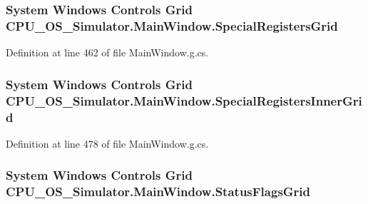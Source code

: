 \subsubsection[{Special\+Registers\+Grid}]{\setlength{\rightskip}{0pt plus 5cm}System Windows Controls Grid C\+P\+U\+\_\+\+O\+S\+\_\+\+Simulator.\+Main\+Window.\+Special\+Registers\+Grid\hspace{0.3cm}{\ttfamily [package]}}\label{class_c_p_u___o_s___simulator_1_1_main_window_a7ce98e44f9236ca31eb5bf3ed81c3372}


Definition at line 462 of file Main\+Window.\+g.\+cs.

\hypertarget{class_c_p_u___o_s___simulator_1_1_main_window_aeef1e97d3e7d589fdab51828260c7b5a}{}
\subsubsection[{Special\+Registers\+Inner\+Grid}]{\setlength{\rightskip}{0pt plus 5cm}System Windows Controls Grid C\+P\+U\+\_\+\+O\+S\+\_\+\+Simulator.\+Main\+Window.\+Special\+Registers\+Inner\+Grid\hspace{0.3cm}{\ttfamily [package]}}\label{class_c_p_u___o_s___simulator_1_1_main_window_aeef1e97d3e7d589fdab51828260c7b5a}


Definition at line 478 of file Main\+Window.\+g.\+cs.

\hypertarget{class_c_p_u___o_s___simulator_1_1_main_window_afdda5e5a39c6e3b99300284ea2640e7c}{}
\subsubsection[{Status\+Flags\+Grid}]{\setlength{\rightskip}{0pt plus 5cm}System Windows Controls Grid C\+P\+U\+\_\+\+O\+S\+\_\+\+Simulator.\+Main\+Window.\+Status\+Flags\+Grid\hspace{0.3cm}{\ttfamily [package]}}\label{class_c_p_u___o_s___simulator_1_1_main_window_afdda5e5a39c6e3b99300284ea2640e7c}


